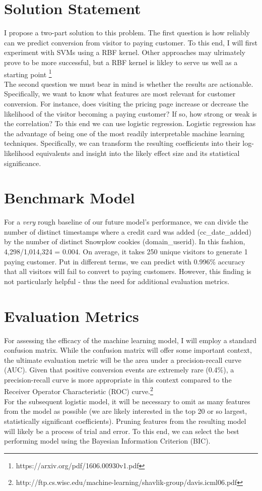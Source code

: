 \documentclass{article} %
\begin{document}
                                                              
\section{Solution Statement}
\indent\indent I propose a two-part solution to this problem. The first question is how reliably can we predict conversion from visitor to paying customer. To this end, I will first experiment with SVMs using a RBF kernel. Other approaches may ulrimately prove to be more successful, but a RBF kernel is likley to serve us well as a starting point \footnote{https://arxiv.org/pdf/1606.00930v1.pdf} \\
\indent The second question we must bear in mind is whether the results are actionable. Specifically, we want to know what features are most relevant for customer conversion. For instance, does visiting the pricing page increase or decrease the likelihood of the visitor becoming a paying customer? If so, how strong or weak is the correlation? To this end we can use logistic regression. Logistic regression has the advantage of being one of the most readily interpretable machine learning techniques. Specifically, we can transform the resulting coefficients into their log-likelihood equivalents and insight into the likely effect size and its statistical significance.   

\section{Benchmark Model}
\indent\indent For a \textit{very} rough baseline of our future model's performance, we can divide the number of distinct timestamps where a credit card was added (cc\_date\_added) by the number of distinct Snowplow cookies (domain\_userid). In this fashion, 4,298/1,014,324 = 0.004. On average, it takes 250 unique visitors to generate 1 paying customer. Put in different terms, we can predict with 0.996\% accuracy that all visitors will fail to convert to paying customers. However, this finding is not particularly helpful - thus the need for additional evaluation metrics.  

\section{Evaluation Metrics}
\indent\indent For assessing the efficacy of the machine learning model, I will employ a standard confusion matrix. While the confusion matrix will offer some important context, the ultimate evaluation metric will be the area under a precision-recall curve (AUC). Given that positive conversion events are extremely rare (0.4\%), a precision-recall curve is more appropriate in this context compared to the Receiver Operator Characteristic (ROC) curve.\footnote{http://ftp.cs.wisc.edu/machine-learning/shavlik-group/davis.icml06.pdf}\\
\indent For the subsequent logistic model, it will be necessary to omit as many features from the model as possible (we are likely interested in the top 20 or so largest, statistically significant coefficients). Pruning features from the resulting model will likely be a process of trial and error. To this end, we can select the best performing model using the Bayesian Information Criterion (BIC).
\end{document}
